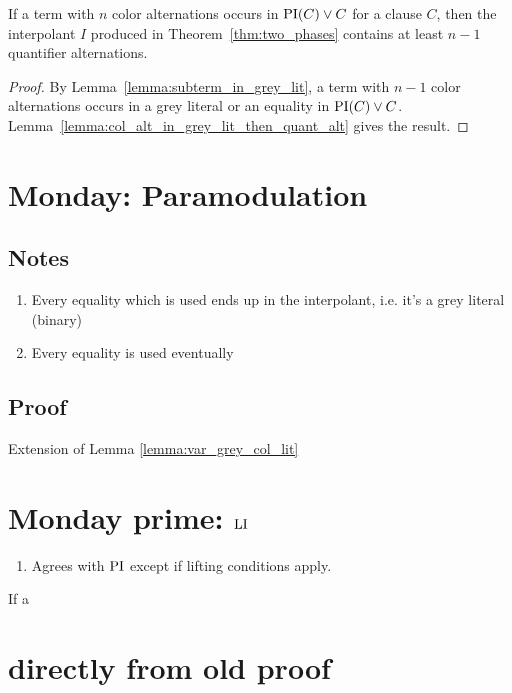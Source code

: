 \documentclass[,%
	draft=false,%
	numbers=noendperiod
	12pt,
	a4paper,
	oneside,%
	openany,
]{memoir}
\begin{document}
\begin{prop}
	\label{prop:color_alt_eq_quant_alt}
	If a term with $n$ color alternations occurs in $\operatorname{PI}(C) \lor C$ for a clause $C$, then the interpolant $I$ produced in Theorem~\ref{thm:two_phases} contains at least $n-1$ quantifier alternations.
\end{prop}
\begin{proof}
	By Lemma~\ref{lemma:subterm_in_grey_lit}, a term with $n-1$ color alternations occurs in a grey literal or an equality in $\operatorname{PI}(C) \lor C$.
	Lemma~\ref{lemma:col_alt_in_grey_lit_then_quant_alt} gives the result.
\end{proof}



\section{Monday: Paramodulation}

\subsection{Notes}
\begin{enumerate}
	\item Every equality which is used ends up in the interpolant, i.e. it's a grey literal (binary)
	\item Every equality is used eventually
\end{enumerate}
\subsection{Proof}

Extension of Lemma \ref{lemma:var_grey_col_lit}

\section{Monday prime: $\operatorname{LI}$}

\begin{enumerate}
	\item Agrees with $\operatorname{PI}$ except if lifting conditions apply.
\end{enumerate}

\begin{lemma}
	If a 
\end{lemma}



\section{directly from old proof}
\end{document}
